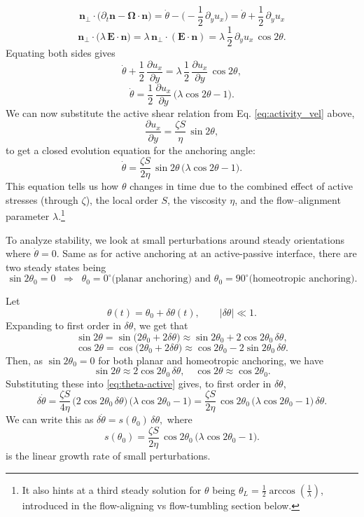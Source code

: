 \documentclass[11pt]{article}
\begin{document}
$$\mathbf{n}_\perp\!\cdot\!\big(\partial_t\mathbf{n} - \boldsymbol{\Omega}\!\cdot\!\mathbf{n}\big)
= \dot\theta - \Big(-\frac{1}{2}\,\partial_y u_x\Big)
= \dot\theta + \frac{1}{2}\,\partial_y u_x$$
$$\mathbf{n}_\perp\!\cdot\!\big(\lambda\,\mathbf{E}\!\cdot\!\mathbf{n}\big) = \lambda\,\mathbf{n}_\perp\!\cdot\!(\mathbf{E}\!\cdot\!\mathbf{n}) = \lambda\,\frac{1}{2}\,\partial_y u_x\,\cos 2\theta.$$
Equating both sides gives
$$\dot\theta + \frac{1}{2}\,\frac{\partial u_x}{\partial y}
= \lambda\,\frac{1}{2}\,\frac{\partial u_x}{\partial y}\,\cos 2\theta,$$
\begin{equation}
\dot\theta
= \frac{1}{2}\,\frac{\partial u_x}{\partial y}\,\big(\lambda\cos 2\theta - 1\big).
\label{eq:theta-shear}
\end{equation}
We can now substitute the active shear relation from Eq. \eqref{eq:activity_vel} above,
$$\frac{\partial u_x}{\partial y} = \frac{\zeta S}{\eta}\,\sin 2\theta,$$
to get a closed evolution equation for the anchoring angle:
\begin{equation}
\dot\theta
= \frac{\zeta S}{2\eta}\,\sin 2\theta\,\big(\lambda\cos 2\theta - 1\big).
\label{eq:theta-active}
\end{equation}
This equation tells us how $\theta$ changes in time due to the combined effect of active stresses (through $\zeta$), the local order $S$, the viscosity $\eta$, and the flow–alignment parameter $\lambda$.\footnote{It also hints at a third steady solution for $\theta$ being $\theta_L = \frac{1}{2}\arccos\!\left(\frac{1}{\lambda}\right)$, introduced in the flow-aligning vs flow-tumbling section below.}

To analyze stability, we look at small perturbations around steady orientations where $\dot\theta=0$. Same as for active anchoring at an active-passive interface, there are two steady states being
$$\sin 2\theta_0=0
\;\;\Rightarrow\;\;
\theta_0=0^\circ \text{(planar anchoring)} \text{ and }
\theta_0=90^\circ \text{(homeotropic anchoring)}.$$

Let
$$\theta(t) = \theta_0 + \delta\theta(t),
\qquad |\delta\theta|\ll1.$$
Expanding to first order in $\delta\theta$, we get that
$$\sin 2\theta = \sin\big(2\theta_0 + 2\delta\theta\big)
\approx \sin 2\theta_0 + 2\cos 2\theta_0\,\delta\theta,$$
$$\cos 2\theta = \cos\big(2\theta_0 + 2\delta\theta\big) \approx \cos 2\theta_0 - 2\sin 2\theta_0\,\delta\theta.$$
Then, as $\sin 2\theta_0=0$ for both planar and homeotropic anchoring, we have
$$\sin 2\theta \approx 2\cos 2\theta_0\,\delta\theta, \quad
\cos 2\theta \approx \cos 2\theta_0.$$
Substituting these into \eqref{eq:theta-active} gives, to first order in $\delta\theta$,
\begin{equation}
    \delta\dot{\theta} = \frac{\zeta S}{4\eta}\,\big(2\cos 2\theta_0\,\delta\theta\big)\,\big(\lambda\cos 2\theta_0 - 1\big) = \frac{\zeta S}{2\eta}\,\cos 2\theta_0\,\big(\lambda\cos 2\theta_0 - 1\big)\,\delta\theta.
\end{equation}
We can write this as $\delta\dot{\theta} = s(\theta_0)\,\delta\theta,$ where
\begin{equation}
    s(\theta_0) = \frac{\zeta S}{2\eta}\,\cos 2\theta_0\,\big(\lambda\cos 2\theta_0 - 1\big).
\end{equation}
is the linear growth rate of small perturbations. 
\end{document}
